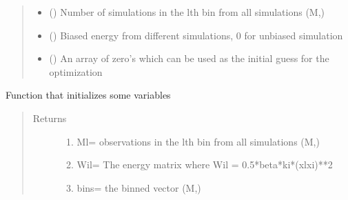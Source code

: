 \documentclass[letterpaper,10pt,english]{sphinxmanual}
\begin{document}
\begin{fulllineitems}
\begin{quote}
\begin{description}
\begin{itemize}
\item {} 
 () \textendash{} Number of simulations in the lth bin from all simulations (M,)

\item {} 
 () \textendash{} Biased energy from different simulations, 0 for unbiased simulation

\item {} 
 () \textendash{} An array of zero’s which can be used as the initial guess for the optimization

\end{itemize}

\end{description}\end{quote}

\begin{fulllineitems}
\label{\detokenize{wham:wham.Bwham.Bwham.initialize}}
Function that initializes some variables
\begin{quote}\begin{description}
\item[{Returns}] \leavevmode
\begin{enumerate}
%
\item {} 
Ml= observations in the lth bin from all simulations (M,)

\item {} 
Wil= The energy matrix where Wil = 0.5*beta*ki*(xl\sphinxhyphen{}xi)**2

\item {} 
bins= the binned vector (M,)

\end{enumerate}


\end{description}\end{quote}

\end{fulllineitems}



\end{fulllineitems}
\end{document}
